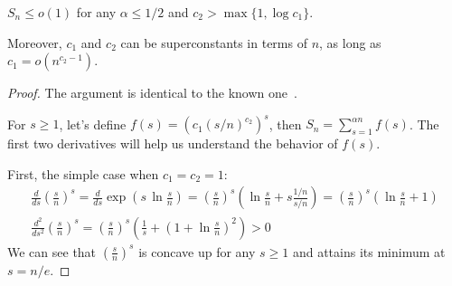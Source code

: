 \begin{proposition}
    \label{pro:bound-prob-large-sets}
    $S_n\leq o(1)$ for any $\alpha\leq 1/2$ and $c_2>\max\{1,\log c_1\}$.
    
    Moreover, $c_1$ and $c_2$ can be superconstants in terms of $n$,
    as long as $c_1=o\left(n^{c_2-1}\right)$.
\end{proposition}

\begin{proof}
    The argument is identical to the known one~\cite{gms03}.
    
    For $s\geq1$, let's define $f(s)=\left(c_1(s/n)^{c_2}\right)^s$, then
    $S_n=\sum_{s=1}^{\alpha n}{f(s)}$.
    The first two derivatives will help us understand the behavior of $f(s)$.
    
    First, the simple case when $c_1=c_2=1$:
    \begin{gather*}
        \frac{d}{ds}\left(\frac{s}{n}\right)^s
        =\frac{d}{ds}\exp\left(s\,\ln\frac{s}{n}\right)
        =\left(\frac{s}{n}\right)^s\left(\ln\frac{s}{n}+s\frac{1/n}{s/n}\right)
        =\left(\frac{s}{n}\right)^s\left(\ln\frac{s}{n}+1\right)\\
        \frac{d^2}{ds^2}\left(\frac{s}{n}\right)^s
        =\left(\frac{s}{n}\right)^s\left(\frac{1}{s}+\left(1+\ln\frac{s}{n}\right)^2\right)>0
    \end{gather*}
    We can see that $\left(\frac{s}{n}\right)^s$ is concave up for any $s\geq1$
    and attains its minimum at $s=n/e$.
    

\end{proof}
